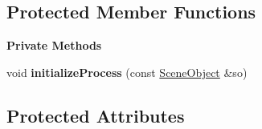 \subsection*{Protected Member Functions}
\begin{Indent}\textbf{ Private Methods}\par
\begin{DoxyCompactItemize}
\item 
\mbox{\label{classrev_1_1_animation_controller_aa7b3b7a5184b516602e9dad4e7dae61a}} 
void {\bfseries initialize\+Process} (const \mbox{\hyperlink{classrev_1_1_scene_object}{Scene\+Object}} \&so)
\end{DoxyCompactItemize}
\end{Indent}
\subsection*{Protected Attributes}
